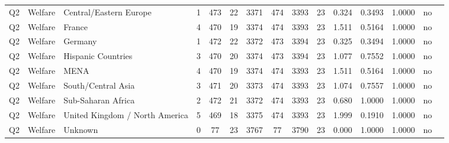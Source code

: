 \begin{longtable}{lllrcccccccccll}
Q2 & Welfare & Central/Eastern Europe & 1 & 473 & 22 & 3371 & 474 & 3393 & 23 & 0.324 & 0.3493 & 1.0000 & no \\
Q2 & Welfare & France & 4 & 470 & 19 & 3374 & 474 & 3393 & 23 & 1.511 & 0.5164 & 1.0000 & no \\
Q2 & Welfare & Germany & 1 & 472 & 22 & 3372 & 473 & 3394 & 23 & 0.325 & 0.3494 & 1.0000 & no \\
Q2 & Welfare & Hispanic Countries & 3 & 470 & 20 & 3374 & 473 & 3394 & 23 & 1.077 & 0.7552 & 1.0000 & no \\
Q2 & Welfare & MENA & 4 & 470 & 19 & 3374 & 474 & 3393 & 23 & 1.511 & 0.5164 & 1.0000 & no \\
Q2 & Welfare & South/Central Asia & 3 & 471 & 20 & 3373 & 474 & 3393 & 23 & 1.074 & 0.7557 & 1.0000 & no \\
Q2 & Welfare & Sub-Saharan Africa & 2 & 472 & 21 & 3372 & 474 & 3393 & 23 & 0.680 & 1.0000 & 1.0000 & no \\
Q2 & Welfare & United Kingdom / North America & 5 & 469 & 18 & 3375 & 474 & 3393 & 23 & 1.999 & 0.1910 & 1.0000 & no \\
Q2 & Welfare & Unknown & 0 & 77 & 23 & 3767 & 77 & 3790 & 23 & 0.000 & 1.0000 & 1.0000 & no \\
\end{longtable}
